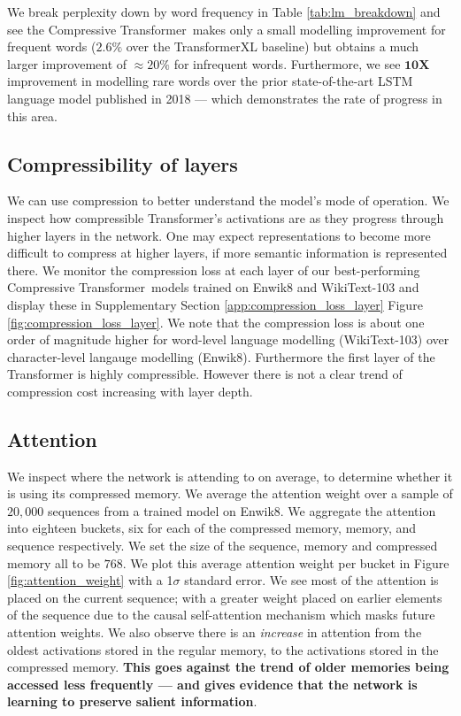 We break perplexity down by word frequency in Table \ref{tab:lm_breakdown} and see the Compressive Transformer~makes only a small modelling improvement for frequent words ($2.6\%$ over the TransformerXL baseline) but obtains a much larger improvement of $\approx 20\%$ for infrequent words. Furthermore, we see $\mathbf{10X}$ improvement in modelling rare words over the prior state-of-the-art LSTM language model published in 2018 --- which demonstrates the rate of progress in this area.

\subsection{Compressibility of layers} We can use compression to better understand the model's mode of operation. We inspect how compressible Transformer's activations are as they progress through higher layers in the network. One may expect representations to become more difficult to compress at higher layers, if more semantic information is represented there. We monitor the compression loss at each layer of our best-performing Compressive Transformer~models trained on Enwik8 and WikiText-103 and display these in Supplementary Section \ref{app:compression_loss_layer} Figure \ref{fig:compression_loss_layer}. We note that the compression loss is about one order of magnitude higher for word-level language modelling (WikiText-103) over character-level langauge modelling (Enwik8). Furthermore the first layer of the Transformer is highly compressible. However there is not a clear trend of compression cost increasing with layer depth.

\subsection{Attention}

We inspect where the network is attending to on average, to determine whether it is using its compressed memory. We average the attention weight over a sample of $20,000$ sequences from a trained model on Enwik8. We aggregate the attention into eighteen buckets, six for each of the compressed memory, memory, and sequence respectively. We set the size of the sequence, memory and compressed memory all to be $768$. We plot this average attention weight per bucket in Figure \ref{fig:attention_weight} with a 1$\sigma$ standard error. We see most of the attention is placed on the current sequence; with a greater weight placed on earlier elements of the sequence due to the causal self-attention mechanism which masks future attention weights. We also observe there is an \textit{increase} in attention from the oldest activations stored in the regular memory, to the activations stored in the compressed memory. \textbf{This goes against the trend of older memories being accessed less frequently --- and gives evidence that the network is learning to preserve salient information}.

